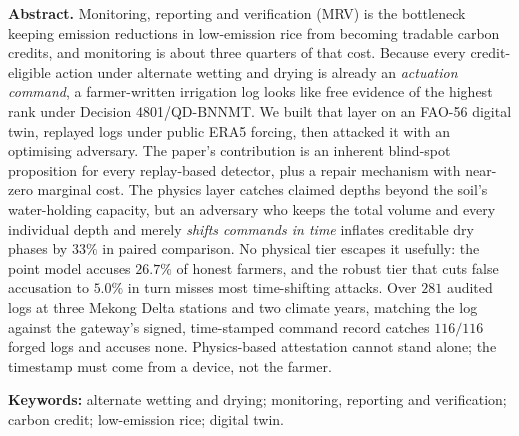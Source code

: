   \vspace{6pt}
  \begin{hujosabstract}
  \noindent\textbf{Abstract.} Monitoring, reporting and verification (MRV) is the bottleneck keeping emission
 reductions in low-emission rice from becoming tradable carbon credits, and
 monitoring is about three quarters of that cost. Because every credit-eligible
 action under alternate wetting and drying is already an \emph{actuation command},
 a farmer-written irrigation log looks like free evidence of the highest rank under
 Decision 4801/QD-BNNMT. We built that layer on an FAO-56 digital twin, replayed logs under public ERA5 forcing, then attacked it with an optimising adversary. The paper's contribution is an inherent blind-spot proposition for every replay-based detector, plus a repair mechanism with near-zero marginal cost. The physics layer catches claimed depths beyond the soil's water-holding capacity, but an adversary who keeps the
 total volume and every individual depth and merely \emph{shifts commands in time}
 inflates creditable dry phases by $33\%$ in paired comparison. No physical tier
 escapes it usefully: the point model accuses $26.7\%$ of honest farmers, and the
 robust tier that cuts false accusation to $5.0\%$ in turn misses most
 time-shifting attacks. Over $281$ audited logs at three Mekong Delta stations
 and two climate years, matching the log against the gateway's signed,
 time-stamped command record catches $116/116$ forged logs and accuses none.
 Physics-based attestation cannot stand alone; the timestamp must come from
 a device, not the farmer.

 \vspace{4pt}

 \noindent\textbf{Keywords:} alternate wetting and drying; monitoring, reporting
  and verification; carbon credit; low-emission rice; digital twin.

  \vspace{10pt}
  \end{hujosabstract}
\endgroup












\begin{table}[!t]
\centering
\caption{Kết tội oan trên nhật ký trung thực, thuộc tính then chốt mà phương án này
được quảng bá. Điều kiện giấy tái hiện kết quả $0/60$ của giao thức tự nhất quán;
điều kiện ruộng phơi bày ngưỡng chênh lệch tuyệt đối.}
\label{tab:falseacc}
\footnotesize

\end{table}

